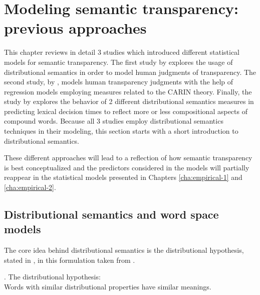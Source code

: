 




\chapter[Previous models]{Modeling semantic transparency: previous approaches}
\label{cha:modPrevious}

This chapter reviews in detail 3 studies which introduced different statistical models
for semantic transparency. The first study by
\citet{Reddyetal:2011} explores the usage of distributional semantics
in order to model human judgments of transparency. The second study,
by \citet{PhamandBaayen:2013}, models human transparency judgments with
the help of regression models employing measures related to the CARIN
theory. Finally, the study by \citet{Marellietal:2014} explores the
behavior of 2 different distributional semantics measures in
predicting lexical decision times to reflect
more or less compositional aspects of compound words. 
Because all 3 studies employ distributional semantics techniques
in their modeling, this section starts with a short introduction to
distributional semantics.

These different approaches will lead to a reflection of how semantic
transparency is best conceptualized and the predictors
considered in the models will partially reappear in the statistical
models presented in Chapters \ref{cha:empirical-1} and
\ref{cha:empirical-2}.




\section{Distributional semantics and word space models}
\label{sec:intro-dist-sem}

The core idea behind distributional semantics is the
distributional hypothesis, stated in \Next, in this formulation
taken from \citet[21]{Sahlgren:2006}.

\ex. The distributional hypothesis:\\
Words with similar distributional properties have similar
meanings.

